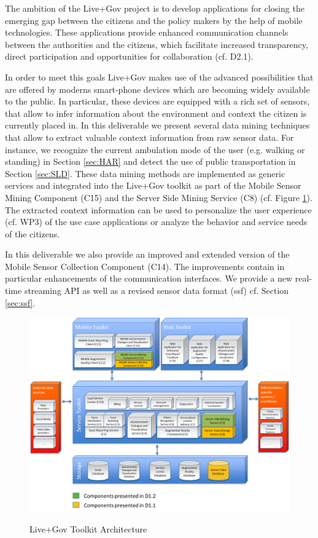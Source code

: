 \documentclass[external]{20120615_deliverable_template_ukob}
\theoremstyle{definition}
\begin{document}
The ambition of the Live+Gov project is to develop applications for
closing the emerging gap between the citizens and the policy makers by
the help of mobile technologies. These applications provide enhanced
communication channels between the authorities and the citizens, which
facilitate increased transparency, direct participation and
opportunities for collaboration (cf. D2.1). 

In order to meet this goals Live+Gov makes use of the advanced
possibilities that are offered by moderns smart-phone devices which
are becoming widely available to the public. In particular, these
devices are equipped with a rich set of sensors, that allow to infer
information about the environment and context the citizen is currently
placed in. In this deliverable we present several data mining
techniques that allow to extract valuable context information from raw
sensor data. For instance, we recognize the current ambulation mode of
the user (e.g. walking or standing) in Section \ref{sec:HAR} and
detect the use of public transportation in Section \ref{sec:SLD}.
These data mining methods are implemented as generic services and
integrated into the Live+Gov toolkit as part of the Mobile Sensor
Mining Component (C15) and the Server Side Mining Service (C8)
(cf. Figure \ref{fig:toolkit}). The extracted context information can
be used to personalize the user experience (cf. WP3) of the use case
applications or analyze the behavior and service needs of the
citizens.

In this deliverable we also provide an improved and extended version
of the Mobile Sensor Collection Component (C14). The improvements
contain in particular enhancements of the communication interfaces. We
provide a new real-time streaming API as well as a revised sensor data
format (ssf) cf. Section \ref{sec:ssf}.

\begin{figure}[ht]
  \centering
  \includegraphics[width = 0.9
  \textwidth]{img/intro/toolkit_architecture.png}
  \label{fig:toolkit}
  \caption{Live+Gov Toolkit Architecture}
\end{figure}
\end{document}
